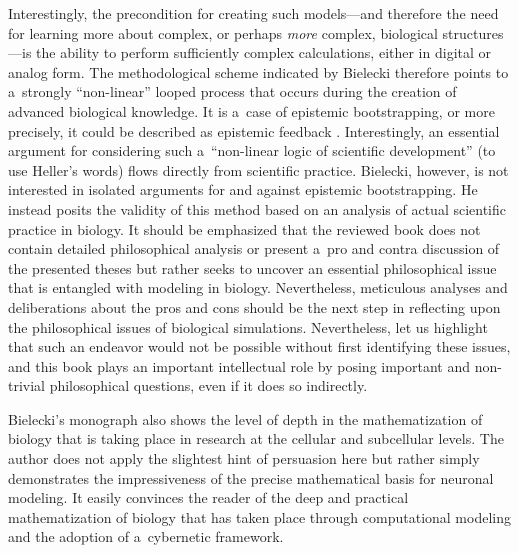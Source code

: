 Interestingly, the precondition for creating such models—and therefore the need for learning more about complex, or perhaps \textit{more} complex, biological structures—is the ability to perform sufficiently complex calculations, either in digital or analog form. The methodological scheme indicated by Bielecki therefore points to a~strongly ``non-linear'' looped process that occurs during the creation of advanced biological knowledge. It is a~case of epistemic bootstrapping, or more precisely, it could be described as epistemic feedback
\parencite[][]{weisberg_bootstrapping_2010}. %
 Interestingly, an essential argument for considering such a~``non-linear logic of scientific development'' (to use Heller's words) flows directly from scientific practice. Bielecki, however, is not interested in isolated arguments for and against epistemic bootstrapping. He instead posits the validity of this method based on an analysis of actual scientific practice in biology. It should be emphasized that the reviewed book does not contain detailed philosophical analysis or present a~pro and contra discussion of the presented theses but rather seeks to uncover an essential philosophical issue that is entangled with modeling in biology. Nevertheless, meticulous analyses and deliberations about the pros and cons should be the next step in reflecting upon the philosophical issues of biological simulations. Nevertheless, let us highlight that such an endeavor would not be possible without first identifying these issues, and this book plays an important intellectual role by posing important and non-trivial philosophical questions, even if it does so indirectly.

Bielecki's monograph also shows the level of depth in the mathematization of biology that is taking place in research at the cellular and subcellular levels. The author does not apply the slightest hint of persuasion here but rather simply demonstrates the impressiveness of the precise mathematical basis for neuronal modeling. It easily convinces the reader of the deep and practical mathematization of biology that has taken place through computational modeling and the adoption of a~cybernetic framework.

